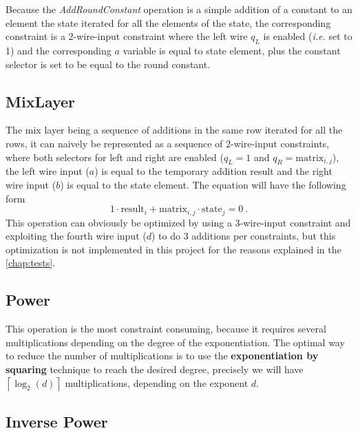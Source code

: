 \documentclass[12pt, a4paper]{report}
\begin{document}
Because the \textit{AddRoundConstant} operation is a simple addition of a constant to an element the state iterated for all the elements of the state, the corresponding constraint is a 2-wire-input constraint where the left wire $q_L$ is enabled (\textsl{i.e.} set to 1) and the corresponding $a$ variable is equal to state element, plus the constant selector is set to be equal to the round constant.

\subsection{MixLayer}\label{subsec:mixlayer}

The mix layer being a sequence of additions in the same row iterated for all the rows, it can naively be represented as a sequence of 2-wire-input constraints, where both selectors for left and right are enabled ($q_L = 1$ and $q_R = \text{matrix}_{i,j}$), the left wire input ($a$) is equal to the temporary addition result and the right wire input ($b$) is equal to the state element.
The equation will have the following form
\begin{equation}
  1 \cdot \text{result}_i + \text{matrix}_{i,j} \cdot \text{state}_{j} = 0\ .
  \label{eq:}
\end{equation}
This operation can obviously be optimized by using a 3-wire-input constraint and exploiting the fourth wire input ($d$) to do 3 additions per constraints, but this optimization is not implemented in this project for the reasons explained in the \autoref{chap:tests}.

\subsection{Power}\label{subsec:power}

This operation is the most constraint consuming, because it requires several multiplications depending on the degree of the exponentiation.
The optimal way to reduce the number of multiplications is to use the \textbf{exponentiation by squaring} technique to reach the desired degree, precisely we will have $\left\lceil \log_2(d) \right\rceil$ multiplications, depending on the exponent $d$.

\subsection{Inverse Power}\label{subsec:invpower}
\end{document}
